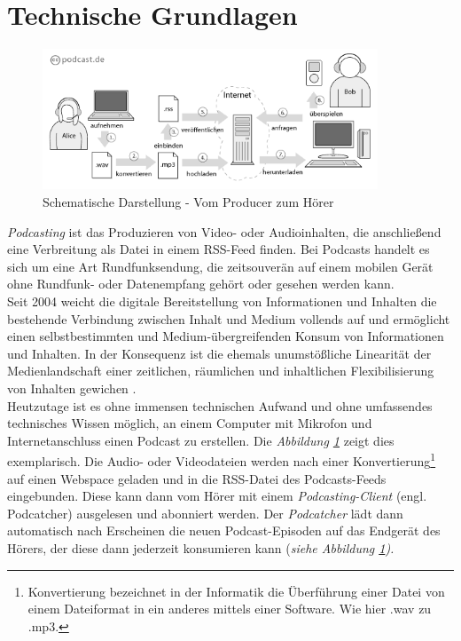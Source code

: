 \documentclass[11pt,a4paper]{scrreprt}
\begin{document}
\section{Technische Grundlagen}
\begin{figure}[h]
\begin{center}
\includegraphics[width=10cm]{Bilder/podcast_prinzip_de.png}
\caption{Schematische Darstellung - Vom Producer zum Hörer \cite{FabioBacigalupo2004}}
\label{Podcastabruf}
\end{center}
\end{figure} 
\noindent \textit{Podcasting} ist das Produzieren von Video- oder Audioinhalten, die anschließend eine Verbreitung als Datei in einem \ac{RSS}-Feed finden. Bei Podcasts handelt es sich um eine Art Rundfunksendung, die zeitsouverän auf einem mobilen Gerät ohne Rundfunk- oder Datenempfang gehört oder gesehen werden kann. \\Seit 2004 weicht die digitale Bereitstellung von Informationen und Inhalten die bestehende Verbindung zwischen Inhalt und Medium vollends auf und ermöglicht einen selbstbestimmten und Medium-übergreifenden Konsum von Informationen und Inhalten. In der Konsequenz ist die ehemals unumstößliche Linearität der Medienlandschaft einer zeitlichen, räumlichen und inhaltlichen Flexibilisierung von Inhalten gewichen \cite[S. 19]{Daenzler2014}. \\
Heutzutage ist es ohne immensen technischen Aufwand und ohne umfassendes technisches Wissen möglich, an einem Computer mit Mikrofon und Internetanschluss einen Podcast zu erstellen. Die \textit{Abbildung \ref{Podcastabruf}} zeigt dies exemplarisch. Die Audio- oder Videodateien werden nach einer Konvertierung\footnote{Konvertierung bezeichnet in der Informatik die Überführung einer Datei von einem Dateiformat in ein anderes mittels einer Software. Wie hier .wav zu .mp3.} auf einen Webspace geladen und in die \ac{RSS}-Datei des Podcasts-Feeds eingebunden. Diese kann dann vom Hörer mit einem \textit{Podcasting-Client} (engl. Podcatcher) ausgelesen und abonniert werden. Der \textit{Podcatcher} lädt dann automatisch nach Erscheinen die neuen Podcast-Episoden auf das Endgerät des Hörers, der diese dann jederzeit konsumieren kann  (\textit{siehe Abbildung \ref{Podcastabruf}).}\\
\end{document}
